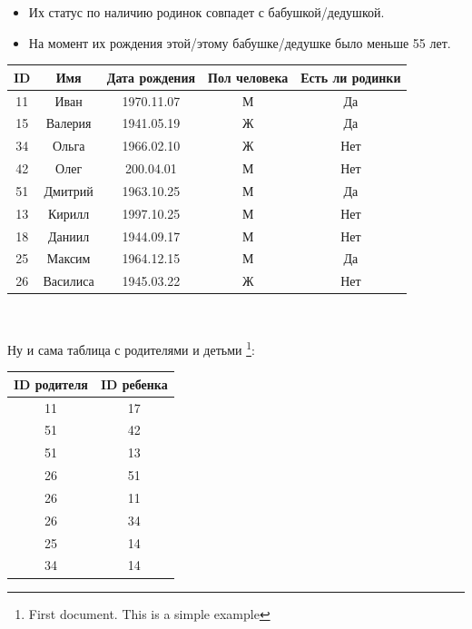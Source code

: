 \documentclass{report}
\begin{document}
\begin{itemize}[noitemsep] %
    \item Их статус по наличию родинок совпадет с бабушкой/дедушкой.
    \item На момент их рождения этой/этому бабушке/дедушке было меньше 55 лет.
\end{itemize}


\begin{flushleft}
\begin{tabular}{ | c | c| c |c|c| }
\hline
\rowcolor[gray]{.6} \textbf{ID} & \textbf{Имя} & \textbf{Дата рождения} & \textbf{Пол  человека} &\textbf{Есть ли родинки }\\ \hline
\rowcolor[gray]{.9} 11 & Иван & 1970.11.07 & М & Да \\
\rowcolor[gray]{.9} 15 & Валерия & 1941.05.19 & Ж & Да \\
\rowcolor[gray]{.9} 34 & Ольга & 1966.02.10 & Ж & Нет \\
\rowcolor[gray]{.9} 42 & Олег & 200.04.01 & М & Нет \\
\rowcolor[gray]{.9} 51 & Дмитрий & 1963.10.25 & М & Да \\
\rowcolor[gray]{.9} 13 & Кирилл & 1997.10.25 & М & Нет \\
\rowcolor[gray]{.9} 18 & Даниил &1944.09.17 & М & Нет \\
\rowcolor[gray]{.9} 25 & Максим &1964.12.15 & М & Да \\
\rowcolor[gray]{.9} 26 & Василиса & 1945.03.22 & Ж & Нет \\
\hline
\end{tabular}\\
\end{flushleft}





Ну и сама таблица с родителями и детьми \footnote{First document. This is a simple example}: 
\begin{tabular}{%
|>{\color{blue}\columncolor[gray]{.9}}c|
>{\color[gray]{.9}\columncolor{blue}}c|}
\hline
 \textbf{ID родителя} & \textbf{ID ребенка}  \\ \hline
 11 & 17 \\
51 & 42 \\
 51 & 13 \\
 26 & 51 \\
 26 & 11 \\
 26 & 34 \\
25 & 14 \\
34 & 14 \\
\hline
\end{tabular}
\clearpage
\end{document}
